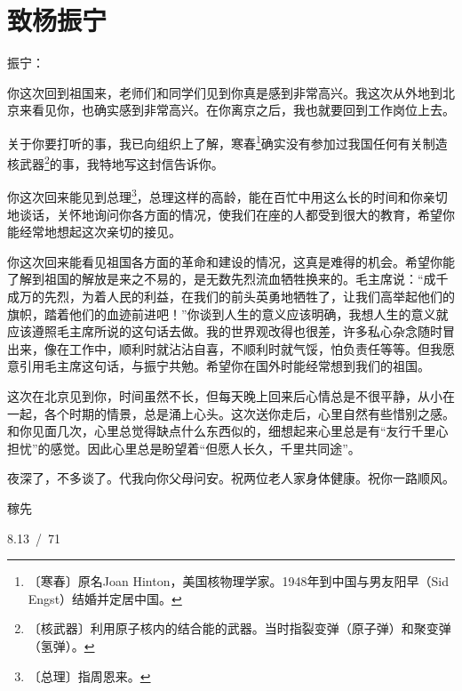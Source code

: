 \documentclass[12pt,UTF-8,openany]{ctexbook}
\begin{document}
\chapter{致杨振宁}

\begin{large}
    
    \noindent 振宁：
    
    \vspace{24pt}
    
    你这次回到祖国来，老师们和同学们见到你真是感到非常高兴。我这次从外地到北京来看见你，也确实感到非常高兴。在你离京之后，我也就要回到工作岗位上去。
    
    关于你要打听的事，我已向组织上了解，寒春\footnote{〔寒春〕原名Joan Hinton，美国核物理学家。1948年到中国与男友阳早（Sid Engst）结婚并定居中国。}确实没有参加过我国任何有关制造核武器\footnote{〔核武器〕利用原子核内的结合能的武器。当时指裂变弹（原子弹）和聚变弹（氢弹）。}的事，我特地写这封信告诉你。
    
    你这次回来能见到总理\footnote{〔总理〕指周恩来。}，总理这样的高龄，能在百忙中用这么长的时间和你亲切地谈话，关怀地询问你各方面的情况，使我们在座的人都受到很大的教育，希望你能经常地想起这次亲切的接见。
    
    你这次回来能看见祖国各方面的革命和建设的情况，这真是难得的机会。希望你能了解到祖国的解放是来之不易的，是无数先烈流血牺牲换来的。毛主席说：“成千成万的先烈，为着人民的利益，在我们的前头英勇地牺牲了，让我们高举起他们的旗帜，踏着他们的血迹前进吧！”你谈到人生的意义应该明确，我想人生的意义就应该遵照毛主席所说的这句话去做。我的世界观改得也很差，许多私心杂念随时冒出来，像在工作中，顺利时就沾沾自喜，不顺利时就气馁，怕负责任等等。但我愿意引用毛主席这句话，与振宁共勉。希望你在国外时能经常想到我们的祖国。
    
    这次在北京见到你，时间虽然不长，但每天晚上回来后心情总是不很平静，从小在一起，各个时期的情景，总是涌上心头。这次送你走后，心里自然有些惜别之感。和你见面几次，心里总觉得缺点什么东西似的，细想起来心里总是有“友行千里心担忧”的感觉。因此心里总是盼望着“但愿人长久，千里共同途”。
    
    夜深了，不多谈了。代我向你父母问安。祝两位老人家身体健康。祝你一路顺风。
    
    \hfill 稼先
    
    \hfill 8.13~/~71
    
    \vspace{36pt}
    
    \begin{flushright}
        
    \end{flushright}
    
    
    
\end{large}
\end{document}
